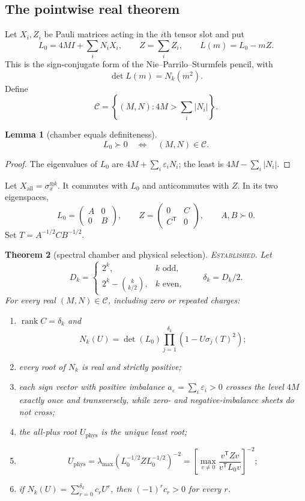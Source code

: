 \documentclass[11pt]{article}
\newtheorem{theorem}{Theorem}[section]
\newtheorem{lemma}[theorem]{Lemma}
\theoremstyle{remark}
\newcommand{\Cham}{\mathcal C}
\newcommand{\rank}{\operatorname{rank}}
\newcommand{\status}[1]{\textup{\textsc{#1}}}
\newcommand{\established}{\status{Established}}
\begin{document}
\subsection{The pointwise real theorem}

Let $X_i,Z_i$ be Pauli matrices acting in the $i$th tensor slot and put
\[
L_0=4MI+\sum_iN_iX_i,\qquad
Z=\sum_iZ_i,\qquad
L(m)=L_0-mZ.
\]
This is the sign-conjugate form of the Nie--Parrilo--Sturmfels pencil, with
\[
\det L(m)=N_k(m^2).
\]
Define
\[
\Cham=\left\{(M,N):4M>\sum_i|N_i|\right\}.
\]

\begin{lemma}[chamber equals definiteness]\label{lem:definite}
\[
L_0\succ0\quad\Longleftrightarrow\quad(M,N)\in\Cham.
\]
\end{lemma}

\begin{proof}
The eigenvalues of $L_0$ are $4M+\sum_i\varepsilon_iN_i$; the least is
$4M-\sum_i|N_i|$.
\end{proof}

Let $X_{\mathrm{all}}=\sigma_x^{\otimes k}$. It commutes with $L_0$
and anticommutes with $Z$. In its two eigenspaces,
\[
L_0=\begin{pmatrix}A&0\\0&B\end{pmatrix},\qquad
Z=\begin{pmatrix}0&C\\C^{\mathsf T}&0\end{pmatrix},
\qquad A,B\succ0.
\]
Set $T=A^{-1/2}CB^{-1/2}$.

\begin{theorem}[spectral chamber and physical selection]
\label{thm:cover}
\established.
Let
\[
D_k=
\begin{cases}
2^k,&k\text{ odd},\\
2^k-\binom{k}{k/2},&k\text{ even},
\end{cases}
\qquad\delta_k=D_k/2.
\]
For every real $(M,N)\in\Cham$, including zero or repeated charges:
\begin{enumerate}[label=(\roman*)]
\item $\rank C=\delta_k$ and
\[
N_k(U)=\det(L_0)
\prod_{j=1}^{\delta_k}
\left(1-U\sigma_j(T)^2\right);
\]
\item every root of $N_k$ is real and strictly positive;
\item each sign vector with positive imbalance
$a_\varepsilon=\sum_i\varepsilon_i>0$ crosses the level $4M$
exactly once and transversely, while zero- and negative-imbalance sheets do
not cross;
\item the all-plus root $U_{\mathrm{phys}}$ is the unique least root;
\item
\[
U_{\mathrm{phys}}
=\lambda_{\max}\left(
L_0^{-1/2}ZL_0^{-1/2}
\right)^{-2}
=\left[
\max_{v\neq0}\frac{v^{\mathsf T}Zv}
{v^{\mathsf T}L_0v}
\right]^{-2};
\]
\item if $N_k(U)=\sum_{r=0}^{\delta_k}c_rU^r$, then
$(-1)^rc_r>0$ for every $r$.
\end{enumerate}
\end{theorem}
\end{document}
